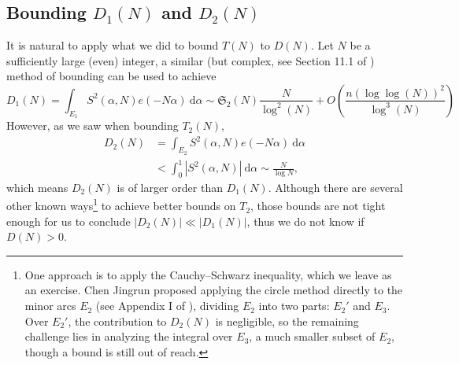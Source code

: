 \documentclass{article}
\begin{document}
\subsection{Bounding $D_1(N)$ and $D_2(N)$}
It is natural to apply what we did to bound $T(N)$ to $D(N)$. Let $N$ be a sufficiently large (even) integer, a similar (but complex, see Section 11.1 of \cite{pan}) method of bounding  can be used to achieve
\begin{equation}
D_1(N) = \int_{E_1} S^2(\alpha, N)e(-N\alpha) \ \mathrm{d}\alpha 
\sim \mathfrak{S}_2(N) \frac{N}{\log^2 (N)} + O\left( \frac{n (\log \log (N))^2}{\log^3 (N)} \right)
\end{equation}
However, as we saw when bounding $T_2(N)$, 
\begin{align*}
    D_2(N) &= \int_{E_2} S^2(\alpha, N)e(-N\alpha)\ \mathrm{d}\alpha\\
            &< \int_{0}^1 |S^2(\alpha, N)|\ \mathrm{d}\alpha \sim \frac{N}{\log N},
\end{align*}
which means $D_2(N)$ is of larger order than $D_1(N)$. Although there are several other known ways\footnote{One approach is to apply the Cauchy--Schwarz inequality, which we leave as an exercise. Chen Jingrun proposed applying the circle method directly to the minor arcs $E_2$ (see Appendix I of \cite{pan}), dividing $E_2$ into two parts: $E_2'$ and $E_3$. Over $E_2'$, the contribution to $D_2(N)$ is negligible, so the remaining challenge lies in analyzing the integral over $E_3$, a much smaller subset of $E_2$, though a bound is still out of reach.} to achieve better bounds on $T_2$, those bounds are not tight enough for us to conclude $|D_2(N)| \ll |D_1(N)|$, thus we do not know if $D(N) > 0$.
\end{document}
